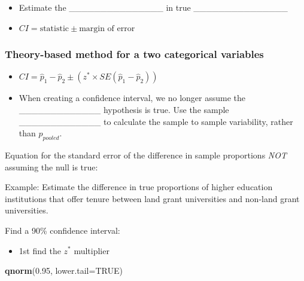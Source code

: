 \documentclass[
]{report}
\newenvironment{Shaded}{\begin{snugshade}}{\end{snugshade}}
\newcommand{\AttributeTok}[1]{\textcolor[rgb]{0.13,0.29,0.53}{#1}}
\newcommand{\ConstantTok}[1]{\textcolor[rgb]{0.56,0.35,0.01}{#1}}
\newcommand{\FloatTok}[1]{\textcolor[rgb]{0.00,0.00,0.81}{#1}}
\newcommand{\FunctionTok}[1]{\textcolor[rgb]{0.13,0.29,0.53}{\textbf{#1}}}
\newcommand{\NormalTok}[1]{#1}
\providecommand{\tightlist}{%
  \setlength{\itemsep}{0pt}\setlength{\parskip}{0pt}}
\begin{document}
\begin{itemize}
\item
  Estimate the \_\_\_\_\_\_\_\_\_\_\_\_\_\_\_ in true \_\_\_\_\_\_\_\_\_\_\_\_\_\_\_
\item
  \(CI = \text{statistic} \pm \text{margin of error}\)
\end{itemize}

\subsubsection*{Theory-based method for a two categorical variables}\label{theory-based-method-for-a-two-categorical-variables}

\begin{itemize}
\tightlist
\item
  \(CI = \hat{p}_1-\hat{p}_2 \pm (z^* \times SE(\hat{p}_1-\hat{p}_2))\)
\end{itemize}


\begin{itemize}
\tightlist
\item
  When creating a confidence interval, we no longer assume the \_\_\_\_\_\_\_\_\_\_\_\_\_ hypothesis is true. Use the sample \_\_\_\_\_\_\_\_\_\_\_\_\_ to calculate the sample to sample variability, rather than \(\hat{p}_{pooled}\).
\end{itemize}


Equation for the standard error of the difference in sample proportions \emph{NOT} assuming the null is true:

\vspace{0.6in}

\newpage

Example: Estimate the difference in true proportions of higher education institutions that offer tenure between land grant universities and non-land grant universities.

Find a 90\% confidence interval:

\begin{itemize}
\tightlist
\item
  1st find the \(z^*\) multiplier
\end{itemize}

\begin{Shaded}
\begin{Highlighting}[]
\FunctionTok{qnorm}\NormalTok{(}\FloatTok{0.95}\NormalTok{, }\AttributeTok{lower.tail=}\ConstantTok{TRUE}\NormalTok{)}
\end{Highlighting}
\end{Shaded}
\end{document}
